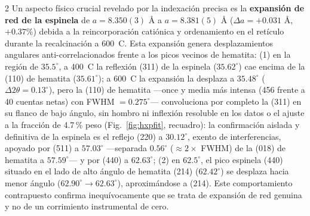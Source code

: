 \documentclass{article}
\begin{document}
\begin{multicols}{2}
Un aspecto físico crucial revelado por la indexación precisa es la \textbf{expansión de red de la espinela} de $a = 8.350(3)$ \r{A} a $a = 8.381(5)$ \r{A} ($\Delta a = +0.031$ \r{A}, $+0.37\%$) debida a la reincorporación catiónica y ordenamiento en el retículo durante la recalcinación a 600\ \textdegree C. Esta expansión genera desplazamientos angulares anti-correlacionados frente a los picos vecinos de hematita:
(1) en la región de $35.5^\circ$, a 400\ \textdegree C la reflexión (311) de la espinela ($35.62^\circ$) cae encima de la (110) de hematita ($35.61^\circ$); a 600\ \textdegree C la expansión la desplaza a $35.48^\circ$ ($\Delta 2\theta = 0.13^\circ$), pero la (110) de hematita ---once y media más intensa (456 frente a 40 cuentas netas) con FWHM $= 0.275^\circ$--- convoluciona por completo la (311) en su flanco de bajo ángulo, sin hombro ni inflexión resoluble en los datos o el ajuste a la fracción de 4.7\,\% peso (Fig.~\ref{fig:hxpfit}, recuadro): la confirmación aislada y definitiva de la espinela es el reflejo (220) a $30.12^\circ$, exento de interferencias, apoyado por (511) a $57.03^\circ$ ---separada $0.56^\circ$ ($\approx 2\times$ FWHM) de la (018) de hematita a $57.59^\circ$--- y por (440) a $62.63^\circ$;
(2) en $62.5^\circ$, el pico espinela (440) situado en el lado de alto ángulo de hematita (214) ($62.42^\circ$) se desplaza hacia menor ángulo ($62.90^\circ \to 62.63^\circ$), aproximándose a (214). Este comportamiento contrapuesto confirma inequívocamente que se trata de expansión de red genuina y no de un corrimiento instrumental de cero.


\end{multicols}
\end{document}
